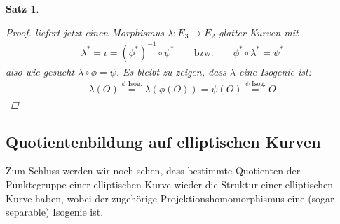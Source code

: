 \documentclass[english, german, parskip=half]{scrartcl}
\newtheorem{Satz}{Satz}[section]
\theoremstyle{definition}
\theoremstyle{remark}
\renewcommand{\O}{O}
\begin{document}
\begin{Satz}
\begin{proof}
    liefert jetzt einen Morphismus $\lambda\colon E_3\to E_2$ glatter
    Kurven mit
    \begin{gather*}
      \lambda^* = \iota = (\phi^*)^{-1} \circ \psi^*
      \qquad\text{bzw.}\qquad
      \phi^*\circ\lambda^* = \psi^*
    \end{gather*}
    also wie gesucht $\lambda\circ\phi = \psi$.
    Es bleibt zu zeigen, dass $\lambda$ eine Isogenie ist:
    \begin{gather*}
      \lambda(\O) 
      \overset{\text{$\phi$ Isog.}}{=} \lambda(\phi(\O))
      = \psi(\O) 
      \overset{\text{$\psi$ Isog.}}{=} \O
    \end{gather*}
  \end{proof}
\end{Satz}


\subsection[Quotientenbildung]{Quotientenbildung auf elliptischen Kurven}
Zum Schluss werden wir noch sehen, dass bestimmte Quotienten der
Punktegruppe einer elliptischen Kurve wieder die Struktur einer
elliptischen Kurve haben, wobei der zugehörige
Projektionshomomorphismus eine (sogar separable) Isogenie ist.
\end{document}
